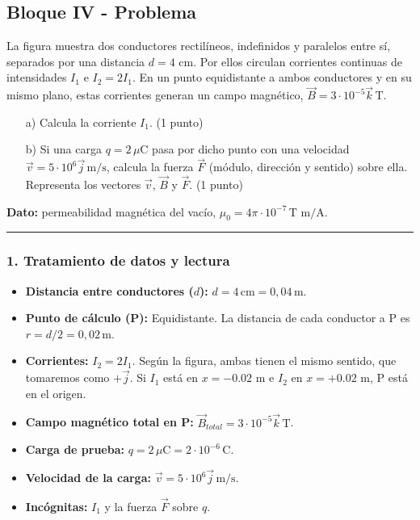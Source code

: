 \subsection{Bloque IV - Problema}
\label{subsec:A4_2017_jul_ext}

\begin{cajaenunciado}
La figura muestra dos conductores rectilíneos, indefinidos y paralelos entre sí, separados por una distancia $d=4$ cm. Por ellos circulan corrientes continuas de intensidades $I_{1}$ e $I_{2}=2 I_{1}$. En un punto equidistante a ambos conductores y en su mismo plano, estas corrientes generan un campo magnético, $\vec{B}=3\cdot10^{-5}\vec{k}\,\text{T}$.
\begin{enumerate}
    \item[a)] Calcula la corriente $I_{1}$. (1 punto)
    \item[b)] Si una carga $q=2\,\mu$C pasa por dicho punto con una velocidad $\vec{v}=5\cdot10^{6}\vec{j}\,\text{m/s}$, calcula la fuerza $\vec{F}$ (módulo, dirección y sentido) sobre ella. Representa los vectores $\vec{v}$, $\vec{B}$ y $\vec{F}$. (1 punto)
\end{enumerate}
\textbf{Dato:} permeabilidad magnética del vacío, $\mu_{0}=4\pi\cdot10^{-7}\,\text{T m/A}$.
\end{cajaenunciado}
\hrule

\subsubsection*{1. Tratamiento de datos y lectura}
\begin{itemize}
    \item \textbf{Distancia entre conductores ($d$):} $d=4\,\text{cm} = 0,04\,\text{m}$.
    \item \textbf{Punto de cálculo (P):} Equidistante. La distancia de cada conductor a P es $r=d/2=0,02\,\text{m}$.
    \item \textbf{Corrientes:} $I_2=2I_1$. Según la figura, ambas tienen el mismo sentido, que tomaremos como $+\vec{j}$. Si $I_1$ está en $x=-0.02$ m e $I_2$ en $x=+0.02$ m, P está en el origen.
    \item \textbf{Campo magnético total en P:} $\vec{B}_{total} = 3\cdot10^{-5}\vec{k}\,\text{T}$.
    \item \textbf{Carga de prueba:} $q = 2\,\mu\text{C} = 2\cdot10^{-6}\,\text{C}$.
    \item \textbf{Velocidad de la carga:} $\vec{v}=5\cdot10^{6}\vec{j}\,\text{m/s}$.
    \item \textbf{Incógnitas:} $I_1$ y la fuerza $\vec{F}$ sobre $q$.
\end{itemize}

